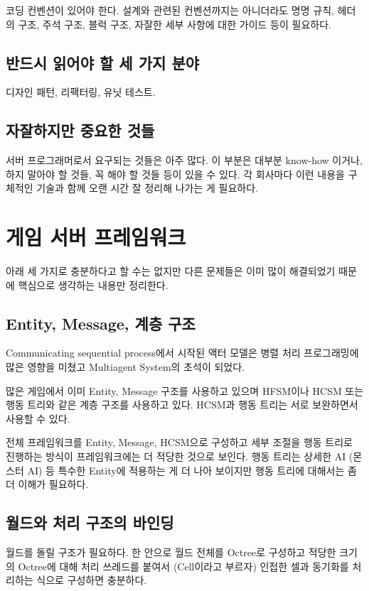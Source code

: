 \documentclass[chapter,kosection, 10.5pt, romanfixed, a4paper]{oblivoir}
\begin{document}
코딩 컨벤션이 있어야 한다. 설계와 관련된 컨벤션까지는 아니더라도 명명 규칙, 헤더의 구조, 
주석 구조, 블럭 구조, 자잘한 세부 사항에 대한 가이드 등이 필요하다. 

\subsection{반드시 읽어야 할 세 가지 분야}

디자인 패턴, 리팩터링, 유닛 테스트. 

\subsection{자잘하지만 중요한 것들}

서버 프로그래머로서 요구되는 것들은 아주 많다. 이 부분은 대부분 know-how 이거나, 하지 말아야 할 것들, 
꼭 해야 할 것들 등이 있을 수 있다. 각 회사마다 이런 내용을 구체적인 기술과 함께 
오랜 시간 잘 정리해 나가는 게 필요하다. 
 
\section{게임 서버 프레임워크}

아래 세 가지로 충분하다고 할 수는 없지만 다른 문제들은 이미 많이 해결되었기 때문에 
핵심으로 생각하는 내용만 정리한다. 

\subsection{Entity, Message, 계층 구조}

Communicating sequential process에서 시작된 액터 모델은 병렬 처리 프로그래밍에 많은 영향을 미쳤고 
Multiagent System의 초석이 되었다. 

많은 게임에서 이미 Entity, Message 구조를 사용하고 있으며 HFSM이나 HCSM 또는 행동 트리와 같은 
계층 구조를 사용하고 있다. HCSM과 행동 트리는 서로 보완하면서 사용할 수 있다. 

전체 프레임워크를 Entity, Message, HCSM으로 구성하고 세부 조절을 행동 트리로 진행하는 방식이 프레임워크에는
더 적당한 것으로 보인다. 행동 트리는 상세한 AI (몬스터 AI) 등 특수한 Entity에 적용하는 게 더 나아 보이지만 
행동 트리에 대해서는 좀 더 이해가 필요하다. 

\subsection{월드와 처리 구조의 바인딩}

월드를 돌릴 구조가 필요하다. 한 안으로 월드 전체를 Octree로 구성하고 적당한 크기의 Octree에 대해 
처리 쓰레드를 붙여서 (Cell이라고 부르자) 인접한 셀과 동기화를 처리하는 식으로 구성하면 충분하다. 
\end{document}
